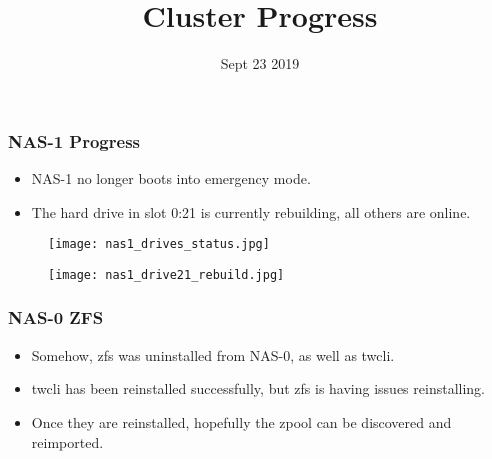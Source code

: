 \documentclass{beamer}
\title{Cluster Progress}
\date{Sept 23 2019}
\begin{document}

\begin{frame}
  \maketitle
\end{frame}



\begin{frame}
  \frametitle{NAS-1 Progress}

  \begin{itemize}
  \item NAS-1 no longer boots into emergency mode.
  \item The hard drive in slot 0:21 is currently rebuilding, all others are online.
  \end{itemize}
  \begin{figure}[H]
    \begin{center}
      \texttt{[image: nas1\_drives\_status.jpg]}
    \end{center}
  \end{figure}

  \begin{figure}[H]
    \begin{center}
      \texttt{[image: nas1\_drive21\_rebuild.jpg]}
    \end{center}
  \end{figure}


\end{frame}

\begin{frame}
  \frametitle{NAS-0 ZFS}

  \begin{itemize}
  \item Somehow, zfs was uninstalled from NAS-0, as well as twcli.
  \item twcli has been reinstalled successfully, but zfs is having issues reinstalling.
  \item Once they are reinstalled, hopefully the zpool can be discovered and reimported.
  \end{itemize}

\end{frame}
\end{document}
